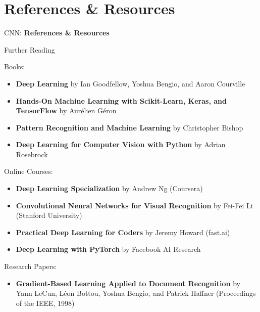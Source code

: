 \section{References \& Resources}
\begin{frame}{}
    \LARGE CNN: \textbf{References \& Resources}
\end{frame}

\begin{frame}{Further Reading}
\begin{block}{Books:}
    \begin{itemize}
    \item \textbf{Deep Learning} by Ian Goodfellow, Yoshua Bengio, and Aaron Courville \vspace{0.5em}
    \item \textbf{Hands-On Machine Learning with Scikit-Learn, Keras, and TensorFlow} by Aurélien Géron \vspace{0.5em}
    \item \textbf{Pattern Recognition and Machine Learning} by Christopher Bishop \vspace{0.5em}
    \item \textbf{Deep Learning for Computer Vision with Python} by Adrian Rosebrock
    \end{itemize}
\end{block}
\framebreak
\begin{block}{Online Courses:}
    \begin{itemize}
        \item \textbf{Deep Learning Specialization} by Andrew Ng (Coursera) \vspace{0.5em}
        \item \textbf{Convolutional Neural Networks for Visual Recognition} by Fei-Fei Li (Stanford University) \vspace{0.5em}
        \item \textbf{Practical Deep Learning for Coders} by Jeremy Howard (fast.ai) \vspace{0.5em}
        \item \textbf{Deep Learning with PyTorch} by Facebook AI Research \vspace{0.5em}
    \end{itemize}
\end{block}
\framebreak
\begin{block}{Research Papers:}
    \begin{itemize}
        \item \textbf{Gradient-Based Learning Applied to Document Recognition} by Yann LeCun, L\'eon Bottou, Yoshua Bengio, and Patrick Haffner (Proceedings of the IEEE, 1998) \vspace{0.5em}

\end{itemize}
\end{block}
\end{frame}
